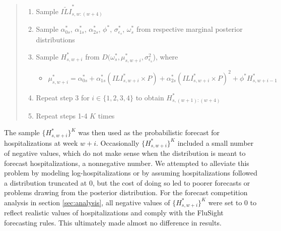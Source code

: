 \begin{quote}
\begin{enumerate}[Step 1:]
  \item Sample $\widetilde{ILI}^*_{s,w:(w + 4)}$
  \item Sample $\alpha_{0s}^*$, $\alpha_{1s}^*$, $\alpha_{2s}^*$, $\phi^*$, 
  $\sigma^*_{\epsilon_s}$, $\omega^*_s$ from respective marginal posterior 
  distributions
  \item Sample $H^*_{s,w + i}$ from $D(\omega_s^*, \mu_{s, w + i}^*,\sigma^2_{\epsilon_s}$), where
  \begin{itemize}
    \item[] $\mu_{s,w + i}^* = \alpha_{0s}^* + \alpha_{1s}^* (ILI_{s,w + i}^* \times P) + \alpha_{2s}^* (ILI_{s,w + i}^* \times P)^2 + \phi^* H^*_{s,w + i - 1}$
  \end{itemize}
   \item Repeat step 3 for $i \in \{1,2,3,4\}$ to obtain $H^*_{s,(w + 1):(w + 4)}$
  \item Repeat steps 1-4 $K$ times
\end{enumerate}
\end{quote}
The sample $\{H^*_{s,w + i}\}^K$ was then used as the probabilistic forecast 
for hospitalizations at week $w + i$. 
Occasionally $\{H^*_{s,w + i}\}^K$ included a small number of negative values,
which do not make sense when the distribution is meant to forecast
hospitalizations, a nonnegative number. We attempted to alleviate this problem
by modeling log-hospitalizations or by assuming hospitalizations followed a
distribution truncated at 0, but the cost of doing so led to poorer forecasts
or problems drawing from the posterior distribution.
For the forecast competition analysis in 
section \ref{sec:analysis}, all negative values of $\{H^*_{s,w + i}\}^K$ were 
set to 0 to reflect realistic values of hospitalizations and comply with the 
FluSight forecasting rules. This ultimately made almost no difference in 
results.


















